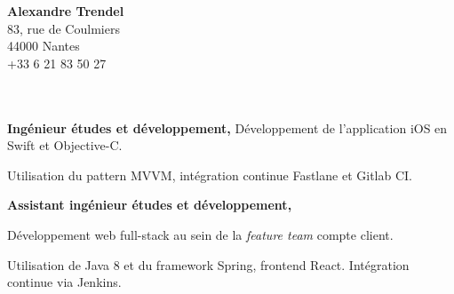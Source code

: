\documentclass{cv}
\begin{document}
\pagestyle{empty}

\begin{minipage}[c]{0.6\textwidth}
\end{minipage}
\begin{minipage}[c]{0.4\textwidth}

\textbf{\large Alexandre Trendel} \\
83, rue de Coulmiers \\
44000 Nantes \\
 +33 6 21 83 50 27 \\
 \href{mailto:trendel.alexandre@gmail.com}{} \\
 \href{https://github.com/xou816}{} \\

\end{minipage}

\vspace{1cm}


\begin{mainexpbox}[title=nov. 2019 -- aujourd'hui]

	\begin{minipage}[c]{20mm}
	\end{minipage}
	\begin{minipage}[c]{0.8\textwidth}

	\textbf{Ingénieur études et développement, \evtech{}} \newline
	Développement de l'application iOS \href{https://apps.apple.com/fr/app/oui-sncf-train-et-bus/id343889987}{} en Swift et Objective-C. 

	Utilisation du pattern MVVM, intégration continue Fastlane et Gitlab CI.
	\end{minipage}

\end{mainexpbox}

\begin{expbox}[title={déc. 2016, \faicon{clock-o} 3 ans}]

	\begin{minipage}[c]{20mm}
	\end{minipage}
	\begin{minipage}[c]{0.8\textwidth}

	\textbf{Assistant ingénieur études et développement, \evtech{}}

	Développement web full-stack au sein de la \textit{feature team} compte client.

	Utilisation de Java 8 et du framework Spring, frontend React. Intégration continue via Jenkins.
	\end{minipage}

\end{expbox}
\end{document}
